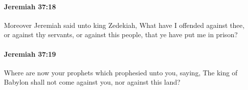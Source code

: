 		\paragraph{Jeremiah 37:18} %
			\label{JEREMIAH-37-18}

			Moreover Jeremiah said unto king Zedekiah, What have I offended against thee, or against thy servants, or against this people, that ye have put me in prison?


		\paragraph{Jeremiah 37:19} %
			\label{JEREMIAH-37-19}

			Where are now your prophets which prophesied unto you, saying, The king of Babylon shall not come against you, nor against this land?



